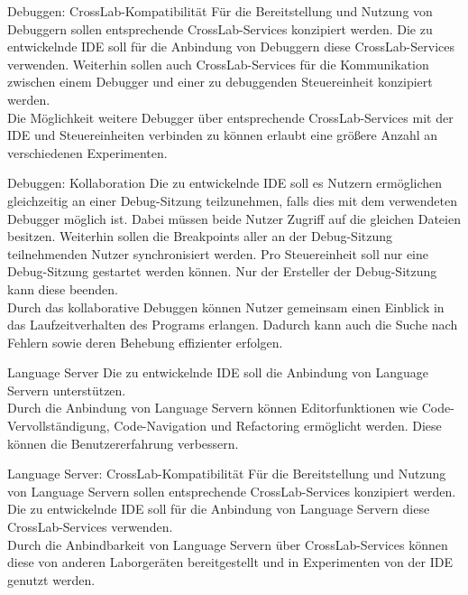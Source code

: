 \begin{requirement}{Debuggen: CrossLab-Kompatibilität}
    \reqdescription Für die Bereitstellung und Nutzung von Debuggern sollen entsprechende CrossLab-Services konzipiert werden. Die zu entwickelnde IDE soll für die Anbindung von Debuggern diese CrossLab-Services verwenden. Weiterhin sollen auch CrossLab-Services für die Kommunikation zwischen einem Debugger und einer zu debuggenden Steuereinheit konzipiert werden. \\
    \reqrationale Die Möglichkeit weitere Debugger über entsprechende CrossLab-Services mit der IDE und Steuereinheiten verbinden zu können erlaubt eine größere Anzahl an verschiedenen Experimenten. \\
\end{requirement}

\begin{requirement}{Debuggen: Kollaboration}
    \reqdescription Die zu entwickelnde IDE soll es Nutzern ermöglichen gleichzeitig an einer Debug-Sitzung teilzunehmen, falls dies mit dem verwendeten Debugger möglich ist. Dabei müssen beide Nutzer Zugriff auf die gleichen Dateien besitzen. Weiterhin sollen die Breakpoints aller an der Debug-Sitzung teilnehmenden Nutzer synchronisiert werden. Pro Steuereinheit soll nur eine Debug-Sitzung gestartet werden können. Nur der Ersteller der Debug-Sitzung kann diese beenden. \\
    \reqrationale Durch das kollaborative Debuggen können Nutzer gemeinsam einen Einblick in das Laufzeitverhalten des Programs erlangen. Dadurch kann auch die Suche nach Fehlern sowie deren Behebung effizienter erfolgen. \\
\end{requirement}

\begin{requirement}{Language Server}
    \reqdescription Die zu entwickelnde IDE soll die Anbindung von Language Servern unterstützen. \\
    \reqrationale Durch die Anbindung von Language Servern können Editorfunktionen wie Code-Vervollständigung, Code-Navigation und Refactoring ermöglicht werden. Diese können die Benutzererfahrung verbessern. \\
\end{requirement}

\begin{requirement}{Language Server: CrossLab-Kompatibilität}
    \reqdescription Für die Bereitstellung und Nutzung von Language Servern sollen entsprechende CrossLab-Services konzipiert werden. Die zu entwickelnde IDE soll für die Anbindung von Language Servern diese CrossLab-Services verwenden. \\
    \reqrationale Durch die Anbindbarkeit von Language Servern über CrossLab-Services können diese von anderen Laborgeräten bereitgestellt und in Experimenten von der IDE genutzt werden. \\
\end{requirement}

